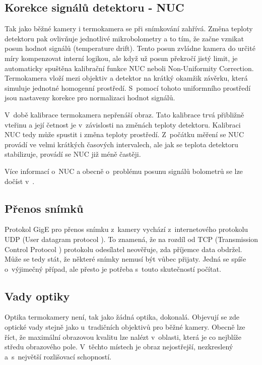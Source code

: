 	\subsection{Korekce signálů detektoru - NUC}\label{section:nuc}
    Tak jako běžné kamery i termokamera se při snímkování zahřívá. Změna teploty detektoru pak ovlivňuje jednotlivé mikrobolometry a to tím, že začne vznikat posun hodnot signálů (temperature drift). Tento posun zvládne kamera do určité míry kompenzovat interní logikou, ale když už posun překročí jistý limit, je automaticky spuštěna kalibrační funkce NUC neboli Non-Uniformity Correction. Termokamera vloží mezi objektiv a detektor na krátký okamžik závěrku, která simuluje jednotné homogenní prostředí. S~pomocí tohoto uniformního prostředí jsou nastaveny korekce pro normalizaci hodnot signálů. 
    
    V~době kalibrace termokamera nepřenáší obraz. Tato kalibrace trvá přibližně vteřinu a její četnost je v~závislosti na změnách teploty detektoru. Kalibraci NUC tedy může spustit i změna teploty prostředí. Z~počátku měření se NUC provádí ve velmi krátkých časových intervalech, ale jak se teplota detektoru stabilizuje, provádí se NUC již méně častěji.
    
   	Více informací o~NUC a obecně o~problému posunu signálů bolometrů se lze dočíst v~\cite{olbrycht2014new, riou2004nonuniformity}.
    
    \subsection{Přenos snímků}\label{section:transmissio_errors}
    Protokol GigE pro přenos snímku z~kamery vychází z~internetového protokolu UDP (User datagram protocol \cite{postel1980user}). To znamená, že na rozdíl od TCP (Transmission Control Protocol \cite{postel1981transmission}) protokolu odesílatel neověřuje, zda příjemce data obdržel. Může se tedy stát, že některé snímky nemusí být vůbec přijaty. Jedná se spíše o~výjimečný případ, ale přesto je potřeba s~touto skutečností počítat. 
    
  	\subsection{Vady optiky}\label{section:lens_deffects}
    Optika termokamery není, tak jako žádná optika, dokonalá. Objevují se zde optické vady stejně jako u~tradičních objektivů pro běžné kamery. Obecně lze říct, že maximální obrazovou kvalitu lze nalézt v~oblasti, která je co nejblíže středu obrazového pole. V~těchto místech je obraz nejostřejší, nezkreslený a~s~největší rozlišovací schopností. 
    
